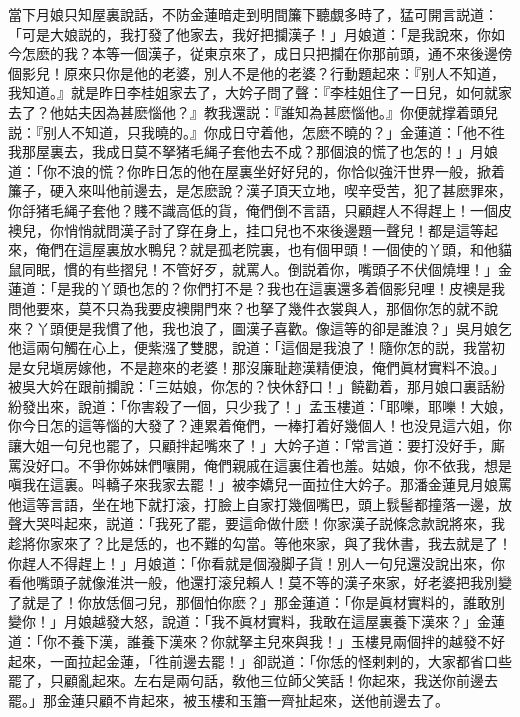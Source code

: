 當下月娘只知屋裏說話，不防金蓮暗走到明間簾下聽覷多時了，猛可開言説道：「可是大娘説的，我打發了他家去，我好把攔漢子！」月娘道：「是我說來，你如今怎麽的我？本等一個漢子，従東京來了，成日只把攔在你那前頭，通不來後邊傍個影兒！原來只你是他的老婆，別人不是他的老婆？行動題起來：『别人不知道，我知道。』就是昨日李桂姐家去了，大妗子問了聲：『李桂姐住了一日兒，如何就家去了？他姑夫因為甚麽惱他？』教我還説：『誰知為甚麽惱他。』你便就撑着頭兒説：『别人不知道，只我曉的。』你成日守着他，怎麽不曉的？」金蓮道：「他不徃我那屋裏去，我成日莫不拏猪毛䋲子套他去不成？那個浪的慌了也怎的！」月娘道：「你不浪的慌？你昨日怎的他在屋裏坐好好兒的，你恰似強汗世界一般，掀着簾子，硬入來叫他前邊去，是怎麽說？漢子頂天立地，喫辛受苦，犯了甚麽罪來，你㧱猪毛䋲子套他？賤不識高低的貨，俺們倒不言語，只顧趕人不得趕上！一個皮襖兒，你悄悄就問漢子討了穿在身上，挂口兒也不來後邊題一聲兒！都是這等起來，俺們在這屋裏放水鴨兒？就是孤老院裏，也有個甲頭！一個使的丫頭，和他貓鼠同眠，慣的有些摺兒！不管好歹，就罵人。倒説着你，嘴頭子不伏個燒埋！」金蓮道：「是我的丫頭也怎的？你們打不是？我也在這裏還多着個影兒哩！皮襖是我問他要來，莫不只為我要皮襖開門來？也拏了幾件衣裳與人，那個你怎的就不說來？丫頭便是我慣了他，我也浪了，圖漢子喜歡。像這等的卻是誰浪？」吳月娘乞他這兩句觸在心上，便紫漒了雙腮，說道：「這個是我浪了！隨你怎的説，我當初是女兒塡房嫁他，不是趂來的老婆！那沒廉耻趂漢精便浪，俺們眞材實料不浪。」被吳大妗在跟前攔說：「三姑娘，你怎的？快休舒口！」饒勸着，那月娘口裏話紛紛發出來，說道：「你害殺了一個，只少我了！」孟玉樓道：「耶嚛，耶嚛！大娘，你今日怎的這等惱的大發了？連累着俺們，一棒打着好幾個人！也没見這六姐，你讓大姐一句兒也罷了，只顧拌起嘴來了！」大妗子道：「常言道：要打没好手，廝罵没好口。不爭你姊妹們嚷開，俺們親戚在這裏住着也羞。姑娘，你不依我，想是嗔我在這裏。呌轎子來我家去罷！」被李嬌兒一面拉住大妗子。那潘金蓮見月娘罵他這等言語，坐在地下就打滚，打臉上自家打幾個嘴巴，頭上䯼髻都撞落一邊，放聲大哭呌起來，説道：「我死了罷，要這命做什麽！你家漢子説條念款說將來，我趁將你家來了？比是恁的，也不難的勾當。等他來家，與了我休書，我去就是了！你趕人不得趕上！」月娘道：「你看就是個潑脚子貨！別人一句兒還没說出來，你看他嘴頭子就像淮洪一般，他還打滚兒賴人！莫不等的漢子來家，好老婆把我別變了就是了！你放恁個刁兒，那個怕你麽？」那金蓮道：「你是眞材實料的，誰敢別變你！」月娘越發大怒，說道：「我不眞材實料，我敢在這屋裏養下漢來？」金蓮道：「你不養下漢，誰養下漢來？你就拏主兒來與我！」玉樓見兩個拌的越發不好起來，一面拉起金蓮，「徃前邊去罷！」卻説道：「你恁的怪剌剌的，大家都省口些罷了，只顧亂起來。左右是兩句話，敎他三位師父笑話！你起來，我送你前邊去罷。」那金蓮只顧不肯起來，被玉樓和玉簫一齊扯起來，送他前邊去了。

